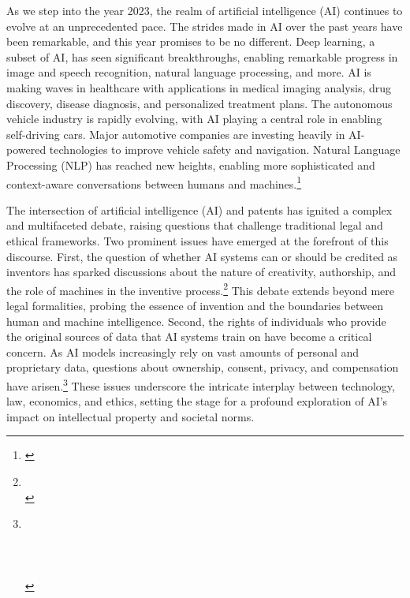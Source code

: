\documentclass{article}[10pt]
\begin{document}
As we step into the year 2023, the realm of artificial intelligence (AI) continues to evolve at an unprecedented pace. 
The strides made in AI over the past years have been remarkable, and this year promises to be no different. 
Deep learning, a subset of AI, has seen significant breakthroughs, enabling remarkable progress in image and speech recognition, natural language processing, and more. 
AI is making waves in healthcare with applications in medical imaging analysis, drug discovery, disease diagnosis, and personalized treatment plans. 
The autonomous vehicle industry is rapidly evolving, with AI playing a central role in enabling self-driving cars. 
Major automotive companies are investing heavily in AI-powered technologies to improve vehicle safety and navigation. 
Natural Language Processing (NLP) has reached new heights, enabling more sophisticated and context-aware conversations between humans and machines.\footnote{
    \cite{identicalCloud}} \par


The intersection of artificial intelligence (AI) and patents has ignited a complex and multifaceted debate, raising questions that challenge traditional legal and ethical frameworks. 
Two prominent issues have emerged at the forefront of this discourse. 
First, the question of whether AI systems can or should be credited as inventors has sparked discussions about the nature of creativity, authorship, and the role of machines in the inventive process.\footnote{
    \cite{ramalho2018patentability}\\
    \indent\indent \cite{yanisky2017artificial}} 
This debate extends beyond mere legal formalities, probing the essence of invention and the boundaries between human and machine intelligence. 
Second, the rights of individuals who provide the original sources of data that AI systems train on have become a critical concern. 
As AI models increasingly rely on vast amounts of personal and proprietary data, questions about ownership, consent, privacy, and compensation have arisen.\footnote{
    \cite{pasquale2015black}\\
    \indent\indent \cite{zarsky2013transparent}\\
    \indent\indent \cite{taylor2016group}\\
    \indent\indent \cite{mittelstadt2016ethics}\\
    \indent\indent \cite{wachter2017right}}
These issues underscore the intricate interplay between technology, law, economics, and ethics, setting the stage for a profound exploration of AI's impact on intellectual property and societal norms.\par
\end{document}
